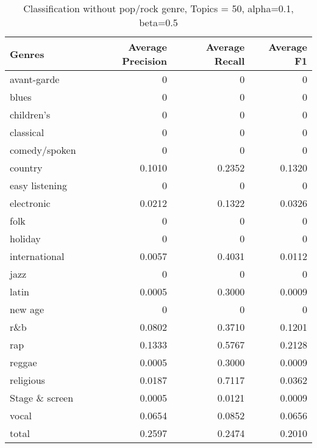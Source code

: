 \begin{table}[h!]
\begin{tabular}{|l|r|r|r|}

\hline
\textbf{Genres} &  \textbf{Average Precision} & \textbf{Average Recall} & \textbf{Average F1} \\
\hline
avant-garde & 0 & 	0	 & 0\\
blues & 0 & 	0 & 	0\\
children's & 0 & 	0 & 	0\\
classical & 0	 & 0 & 	0\\
comedy/spoken & 0 & 	0	 & 0\\
country & 0.1010	 & 0.2352	 & 0.1320\\
easy listening & 0	 & 0 & 	0\\
electronic & 0.0212	 & 0.1322 & 	0.0326\\
folk & 0	 & 0 & 	0\\
holiday & 0 & 	0 & 	0\\
international & 0.0057	 & 0.4031 & 	0.0112\\
jazz & 0	 & 0	 & 0\\
latin & 0.0005	 & 0.3000 & 	0.0009\\
new age & 0 & 	0	 & 0\\
r\&b & 0.0802 & 	0.3710 & 	0.1201\\
rap & 0.1333	 & 0.5767	 & 0.2128\\
reggae & 0.0005	 & 0.3000 & 	0.0009\\
religious & 0.0187	 & 0.7117 & 	0.0362\\
Stage \& screen & 0.0005	 & 0.0121 & 	0.0009\\
vocal & 0.0654 & 	0.0852 & 	0.0656\\
total & 0.2597 & 	0.2474 & 	0.2010\\
\hline
\end{tabular}
\caption{Classification without pop/rock genre, Topics = 50, alpha=0.1, beta=0.5}
\end{table}